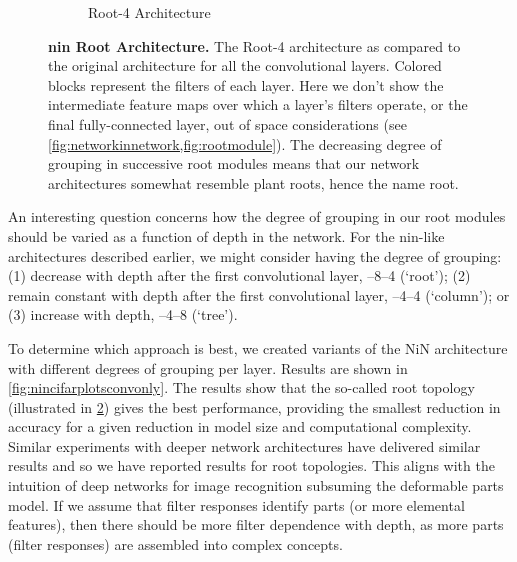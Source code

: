 \documentclass[thesis]{subfiles}
\begin{document}
{\begin{landscape}
\begin{figure}[p]
\begin{subfigure}[b]{0.98\linewidth}
			\caption{Root-4 Architecture}
			\label{fig:root4topology}
		\end{subfigure}
		\caption[\Gls{nin} standard \vs root architecture]{\textbf{\Gls{nin} Root Architecture.} The Root-4 architecture as compared to the original architecture for all the convolutional layers. Colored blocks represent the filters of each layer. Here we don't show the intermediate feature maps over which a layer's filters operate, or the final fully-connected layer, out of space considerations (see \cref{fig:networkinnetwork,fig:rootmodule}). The decreasing degree of grouping in successive root modules means that our network architectures somewhat resemble plant roots, hence the name root.
		}\label{fig:networktopology}
	\end{figure}
	\end{landscape}
	}
	An interesting question concerns how the degree of grouping in our root modules should be varied as a function of depth in the network. For the \gls{nin}-like architectures described earlier, we might consider having the degree of grouping: (1) decrease with depth after the first convolutional layer, --8--4 (`root'); (2) remain constant with depth after the first convolutional layer, --4--4 (`column'); or (3) increase with depth, --4--8 (`tree').
	
	To determine which approach is best, we created variants of the NiN architecture with different degrees of grouping per layer. Results are shown in \cref{fig:nincifarplotsconvonly}. The results show that the so-called root topology (illustrated in \cref{fig:networktopology}) gives the best performance, providing the smallest reduction in accuracy for a given reduction in model size and computational complexity. Similar experiments with deeper network architectures have delivered similar results and so we have reported results for root topologies. This aligns with the intuition of deep networks for image recognition subsuming the deformable parts model. If we assume that filter responses identify parts (or more elemental features), then there should be more filter dependence with depth, as more parts (filter responses) are assembled into complex concepts.
	
\end{document}
